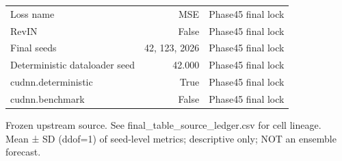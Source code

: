 \begin{table}[h!]
\begin{tabular}{lrr}
Loss name & MSE & Phase45 final lock \\
RevIN & False & Phase45 final lock \\
Final seeds & 42, 123, 2026 & Phase45 final lock \\
Deterministic dataloader seed & 42.000 & Phase45 final lock \\
cudnn.deterministic & True & Phase45 final lock \\
cudnn.benchmark & False & Phase45 final lock \\
\bottomrule
\end{tabular}
\vspace{4pt}
\footnotesize{Frozen upstream source. See final\_table\_source\_ledger.csv for cell lineage.}\\
\footnotesize{Mean ± SD (ddof=1) of seed-level metrics; descriptive only; NOT an ensemble forecast.}\\
\end{table}
